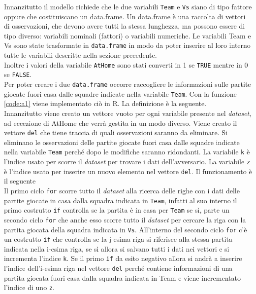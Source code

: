 Innanzitutto il modello richiede che le due variabili \texttt{Team} e \texttt{Vs} siano di tipo fattore oppure che costituiscano un \textsf{data.frame}. Un \textsf{data.frame} è una raccolta di vettori di osservazioni, che devono avere tutti la stessa lunghezza, ma possono essere di tipo diverso: variabili nominali (fattori) o variabili numeriche.
Le variabili \textsf{Team} e \textsf{Vs} sono state trasformate in \texttt{data.frame} in modo da poter inserire al loro interno tutte le variabili descritte nella sezione precedente.\\
Inoltre  i valori della variabile \texttt{AtHome} sono stati converti in 1 se \texttt{TRUE} mentre in 0 se \texttt{FALSE}.\\
Per poter creare i due \texttt{data.frame} occorre raccogliere le informazioni sulle partite giocate fuori casa dalle squadre indicate nella variabile \texttt{Team}. Con la funzione \ref{code:a1} viene implementato ciò in R. La definizione è la seguente.\\
Innanzitutto viene creato un vettore vuoto per ogni variabile presente nel \emph{dataset}, ad eccezione di \textsf{AtHome} che verrà gestita in un modo diverso. Viene creato il vettore \texttt{del} che tiene traccia di quali osservazioni saranno da eliminare. Si eliminano le osservazioni delle partite giocate fuori casa dalle squadre indicate nella variabile \texttt{Team} perché dopo le modifiche saranno ridondanti. La variabile \texttt{k} è l'indice usato per scorre il \emph{dataset} per trovare i dati dell'avversario. La variabile \texttt{z} è l'indice usato per inserire un nuovo elemento nel vettore \texttt{del}. Il funzionamento è il seguente\\
Il primo ciclo \texttt{for} scorre tutto il \emph{dataset} alla ricerca delle righe con i dati delle partite giocate in casa dalla squadra indicata in \texttt{Team}, infatti al suo interno il primo costrutto \texttt{if} controlla se la partita è in casa per \texttt{Team} se sì, parte un secondo ciclo \texttt{for} che anche esso scorre tutto il \emph{dataset} per cercare la riga con la partita giocata della squadra indicata in \texttt{Vs}. All'interno del secondo ciclo \texttt{for} c'è un costrutto \texttt{if} che controlla se la j-esima riga si riferisce alla stessa partita indicata nella i-esima riga, se sì allora si salvano tutti i dati nei vettori e si incrementa l'indice \texttt{k}. Se il primo \texttt{if} da esito negativo allora si andrà a inserire l'indice dell'i-esima riga nel vettore \texttt{del} perché contiene informazioni di una partita giocata fuori casa dalla squadra indicata in \textsf{Team} e viene incrementato l'indice di uno \texttt{z}.\\

